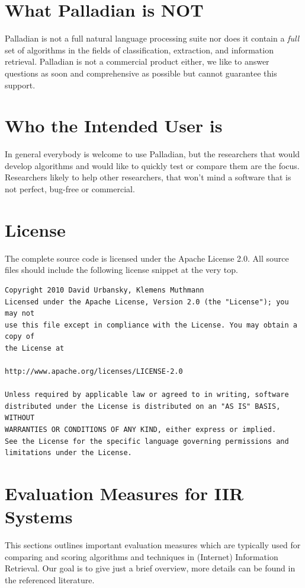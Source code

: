 \section{What Palladian is NOT}
Palladian is not a full natural language processing suite nor does it contain a \textit{ full} set of algorithms in the fields of classification, extraction, and information retrieval. Palladian is not a commercial product either, we like to answer questions as soon and comprehensive as possible but cannot guarantee this support.

\section{Who the Intended User is}
In general everybody is welcome to use Palladian, but the researchers that would develop algorithms and would like to quickly test or compare them are the focus. Researchers likely to help other researchers, that won't mind a software that is not perfect, bug-free or commercial.

\section{License}
The complete source code is licensed under the Apache License 2.0. All source files should include the following license snippet at the very top.

\begin{verbatim}
Copyright 2010 David Urbansky, Klemens Muthmann
Licensed under the Apache License, Version 2.0 (the "License"); you may not
use this file except in compliance with the License. You may obtain a copy of
the License at

http://www.apache.org/licenses/LICENSE-2.0

Unless required by applicable law or agreed to in writing, software
distributed under the License is distributed on an "AS IS" BASIS, WITHOUT
WARRANTIES OR CONDITIONS OF ANY KIND, either express or implied.
See the License for the specific language governing permissions and
limitations under the License.
\end{verbatim}

\section{Evaluation Measures for IIR Systems}

This sections outlines important evaluation measures which are typically used for comparing and scoring algorithms and techniques in (Internet) Information Retrieval. Our goal is to give just a brief overview, more details can be found in the referenced literature.

